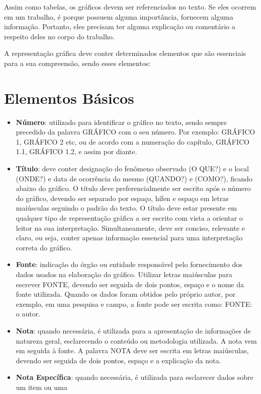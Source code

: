 \inic Assim como tabelas, os gráficos devem ser referenciados no texto. Se eles ocorrem em um trabalho, é porque possuem alguma importância, fornecem alguma informação. Portanto, eles precisam ter alguma explicação ou comentário a respeito deles no corpo do trabalho.\vskip0.3cm 

\inic A representação gráfica deve conter determinados elementos que são essenciais para a sua compreensão, sendo esses elementos:

\section{Elementos Básicos}

\begin{itemize}
\item \textbf{Número}: utilizado para identificar o gráfico no
texto, sendo sempre precedido da palavra GRÁFICO com o seu número.
Por exemplo: GRÁFICO 1, GRÁFICO 2 etc, ou de acordo com a
numeração do capítulo, GRÁFICO 1.1, GRÁFICO 1.2, e assim por
diante. \item \textbf{Título}: deve conter designação do fenômeno
observado (O QUE?) e o local (ONDE?) e data de ocorrência do mesmo
(QUANDO?) e (COMO?), ficando abaixo do gráfico. O título deve
preferencialmente ser escrito após o número do gráfico, devendo
ser separado por espaço, hífen e espaço em letras maiúsculas
seguindo o padrão do texto. O título deve estar presente em qualquer tipo de representação gráfica a ser escrito com vista a orientar o leitor na sua interpretação. Simultaneamente, deve ser conciso, relevante e claro, ou seja, conter apenas informação essencial para uma interpretação correta do gráfico. 
\item \textbf{Fonte}: indicação do
órgão ou entidade responsável pelo fornecimento dos dados usados
na elaboração do gráfico. Utilizar letras maiúsculas para escrever
FONTE, devendo ser seguida de dois pontos, espaço e o nome da
fonte utilizada. Quando os dados foram obtidos pelo próprio autor,
por exemplo, em uma pesquisa e campo, a fonte pode ser escrita
como: FONTE: o autor. \item \textbf{Nota}: quando necessária, é
utilizada para a apresentação de informações de natureza geral,
esclarecendo o conteúdo ou metodologia utilizada. A nota vem em
seguida à fonte. A palavra NOTA deve ser escrita em letras
maiúsculas, devendo ser seguida de dois pontos, espaço e a
explicação da nota. \item \textbf{Nota Específica}: quando
necessária, é utilizada para esclarecer dados sobre um item ou uma

\end{itemize}
